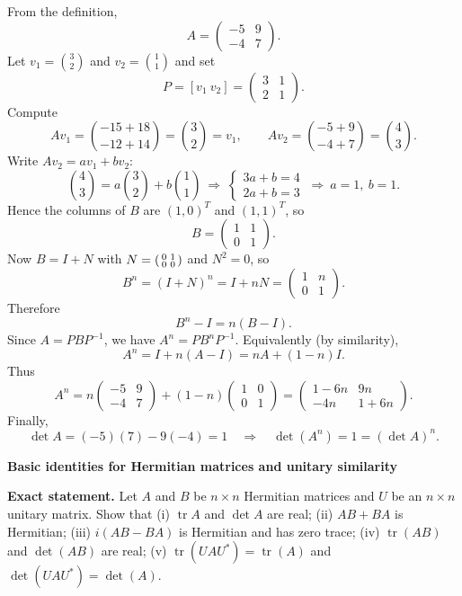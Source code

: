\begin{solution}
From the definition,
\[
A=\begin{pmatrix}-5&9\\-4&7\end{pmatrix}.
\]
Let $v_1=\binom{3}{2}$ and $v_2=\binom{1}{1}$ and set
\[
P=[v_1\ v_2]=\begin{pmatrix}3&1\\2&1\end{pmatrix}.
\]
Compute
\[
Av_1=\binom{-15+18}{-12+14}=\binom{3}{2}=v_1,
\qquad
Av_2=\binom{-5+9}{-4+7}=\binom{4}{3}.
\]
Write $Av_2=a v_1+b v_2$:
\[
\binom{4}{3}=a\binom{3}{2}+b\binom{1}{1}
\ \Longrightarrow\
\begin{cases}
	3a+b=4\\
	2a+b=3
\end{cases}
\ \Longrightarrow\ a=1,\ b=1.
\]
Hence the columns of $B$ are $(1,0)^T$ and $(1,1)^T$, so
\[
\boxed{
	B=\begin{pmatrix}1&1\\0&1\end{pmatrix}.}
\]
Now $B=I+N$ with $N=\begin{psmallmatrix}0&1\\0&0\end{psmallmatrix}$ and $N^2=0$, so
\[
B^n=(I+N)^n=I+nN=\begin{pmatrix}1&n\\0&1\end{pmatrix}.
\]
Therefore
\[
\boxed{B^n-I=n(B-I).}
\]
Since $A=PBP^{-1}$, we have $A^n=PB^nP^{-1}$. Equivalently (by similarity),
\[
A^n=I+n(A-I)=nA+(1-n)I.
\]
Thus
\[
\boxed{
	A^n
	=
	n\begin{pmatrix}-5&9\\-4&7\end{pmatrix}+(1-n)\begin{pmatrix}1&0\\0&1\end{pmatrix}
	=
	\begin{pmatrix}
		1-6n & 9n\\
		-4n & 1+6n
	\end{pmatrix}.}
\]
Finally,
\[
\det A = (-5)(7)-9(-4)=1
\quad\Rightarrow\quad
\det(A^n)=1=(\det A)^n.
\]
\end{solution}

\begin{problem}[CP-I-0092]
\label{prob:cp-i-0092}
\textbf{Basic identities for Hermitian matrices and unitary similarity}

\textbf{Exact statement.}
\hspace*{1.5em}Let \(A\) and \(B\) be \(n\times n\) Hermitian matrices and \(U\) be an \(n\times n\) unitary matrix. Show that
(i) \(\operatorname{tr}A\) and \(\det A\) are real;
(ii) \(AB+BA\) is Hermitian;
(iii) \(i(AB-BA)\) is Hermitian and has zero trace;
(iv) \(\operatorname{tr}(AB)\) and \(\det(AB)\) are real;
(v) \(\operatorname{tr}(UAU^\ast)=\operatorname{tr}(A)\) and \(\det(UAU^\ast)=\det(A)\).

\end{problem}

